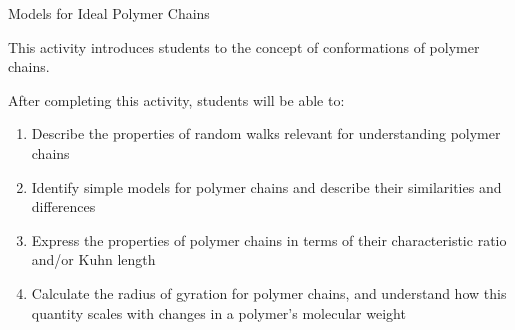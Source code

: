 %
%
%
%

\renewcommand{\figpath}{content/polymphys/chain-confs/chain-models/figs}
\renewcommand{\labelbase}{chain-models}

\begin{activity}{Models for Ideal Polymer Chains}

\begin{instructornotes}

	This activity introduces students to the concept of conformations of polymer chains.
	
	After completing this activity, students will be able to:
			\begin{enumerate}
				\item Describe the properties of random walks relevant for understanding polymer chains
				\item Identify simple models for polymer chains and describe their similarities and differences
				\item Express the properties of polymer chains in terms of their characteristic ratio and/or Kuhn length
				\item Calculate the radius of gyration for polymer chains, and understand how this quantity scales with changes in a polymer's molecular weight
			\end{enumerate}
	
			

\end{instructornotes}
\end{activity}
